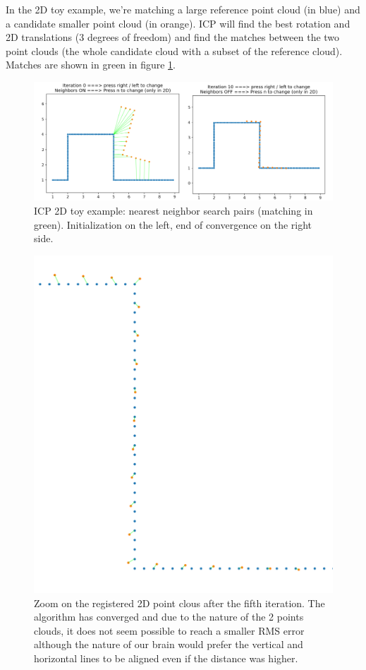 \documentclass[a4paper]{article}
\begin{document}
In the 2D toy example, we're matching a large reference point cloud (in blue) and a candidate smaller point cloud (in orange). 
ICP will find the best rotation and 2D translations (3 degrees of freedom) and find the matches between the two point clouds (the whole candidate cloud with a subset of the reference cloud).
Matches are shown in green in figure \ref{fig:icp_toy}.

\begin{figure}[ht]
  \centering
  \includegraphics[width=0.8\linewidth]{figures/icp_convergence.png}
  \caption{ICP 2D toy example: nearest neighbor search pairs (matching in green). Initialization on the left, end of convergence on the right side.}
  \label{fig:icp_toy}
\end{figure}

\begin{figure}[ht]
  \centering
  \includegraphics[width=0.4\linewidth]{figures/icp_2d_toy_example_zoom.png}
  \caption{Zoom on the registered 2D point clous after the fifth iteration. The algorithm has converged and due to the nature of the 2 points clouds, it does not seem possible to reach a smaller RMS error although the nature of our brain would prefer the vertical and horizontal lines to be aligned even if the distance was higher.}
  \label{fig:icp_toy_convergence_zoom}
\end{figure}

\pagebreak
\end{document}
